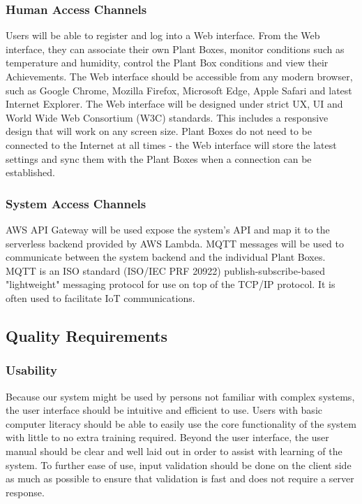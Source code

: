 \documentclass{article}
\begin{document}
\subsubsection{Human Access Channels}
Users will be able to register and log into a Web interface. From the Web interface, they can associate their own Plant Boxes, monitor conditions such as temperature and humidity, control the Plant Box conditions and view their Achievements. The Web interface should be accessible from any modern browser, such as Google Chrome, Mozilla Firefox, Microsoft Edge, Apple Safari and latest Internet Explorer. The Web interface will be designed under strict UX, UI and World Wide Web Consortium (W3C) standards. This includes a responsive design that will work on any screen size. Plant Boxes do not need to be connected to the Internet at all times - the Web interface will store the latest settings and sync them with the Plant Boxes when a connection can be established.

\subsubsection{System Access Channels}
AWS API Gateway will be used expose the system's API and map it to the serverless backend provided by AWS Lambda. MQTT messages will be used to communicate between the system backend and the individual Plant Boxes. MQTT is an ISO standard (ISO/IEC PRF 20922) publish-subscribe-based "lightweight" messaging protocol for use on top of the TCP/IP protocol. It is often used to facilitate IoT communications.

	\subsection{Quality Requirements}
			
		\subsubsection{Usability}
			Because our system might be used by persons not familiar with complex systems, the user interface should be intuitive and efficient to use. Users with basic computer literacy should be able to easily use the core functionality of the system with little to no extra training required. Beyond the user interface, the user manual should be clear and well laid out in order to assist with learning of the system. To further ease of use, input validation should be done on the client side as much as possible to ensure that validation is fast and does not require a server response.
			
\end{document}
